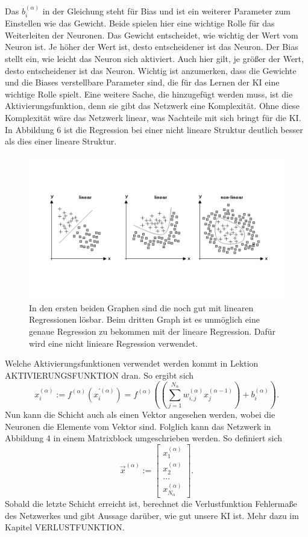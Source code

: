 \documentclass[11pt]{article}
\begin{document}
Das $ b_{i}^{(\alpha)} $ in der Gleichung steht für Bias und ist ein weiterer Parameter zum Einstellen wie das Gewicht. Beide spielen hier eine wichtige Rolle
für das Weiterleiten der Neuronen. Das Gewicht entscheidet, wie wichtig der Wert vom Neuron ist. Je höher der Wert ist, desto entscheidener
ist das Neuron. Der Bias stellt ein, wie leicht das Neuron sich aktiviert. Auch hier gilt, je größer der Wert, desto entscheidener ist das Neuron.
Wichtig ist anzumerken, dass die Gewichte und die Biases verstellbare Parameter sind, die für das Lernen der KI eine wichtige Rolle
spielt. Eine weitere Sache, die hinzugefügt werden muss, ist die Aktivierungsfunktion, denn sie gibt das Netzwerk eine Komplexität.
Ohne diese Komplexität wäre das Netzwerk linear, was Nachteile mit sich bringt für die KI. In Abbildung 6 ist die Regression bei einer
nicht lineare Struktur deutlich besser als dies einer lineare Struktur.
\begin{figure}[h]
    \centering
    \includegraphics[width=400pt, keepaspectratio]{images/regression}
    \caption{In den ersten beiden Graphen sind die noch gut mit linearen Regressionen lösbar. Beim dritten Graph ist es
    unmöglich eine genaue Regression zu bekommen mit der lineare Regression. Dafür wird eine nicht linieare Regression verwendet.}
\end{figure}
Welche Aktivierungsfunktionen verwendet werden kommt in Lektion AKTIVIERUNGSFUNKTION dran. So ergibt sich
\begin{equation}
    x_{i}^{(\alpha)} := f^{(\alpha)}(x_{i}^{'(\alpha)}) = f^{(\alpha)}((\sum_{j=1}^{N_{\alpha}} w_{i,j}^{(\alpha)} x_{j}^{(\alpha-1)}) + b_{i}^{(\alpha)}).
\end{equation}
Nun kann die Schicht auch als einen Vektor angesehen werden, wobei die Neuronen die Elemente vom Vektor sind. Folglich kann das Netzwerk
in Abbildung 4 in einem Matrixblock umgeschrieben werden. So definiert sich
\begin{equation}
    \vec{x}^{(\alpha)} := \begin{bmatrix}x_{1}^{(\alpha)} \\ x_{2    }^{(\alpha)} \\ \ldots \\ x_{N_{\alpha}}^{(\alpha)} \end{bmatrix}.
\end{equation}
Sobald die letzte Schicht erreicht ist, berechnet die Verlustfunktion Fehlermaße des Netzwerkes und gibt Aussage darüber, wie gut
unsere KI ist. Mehr dazu im Kapitel VERLUSTFUNKTION.
\end{document}
